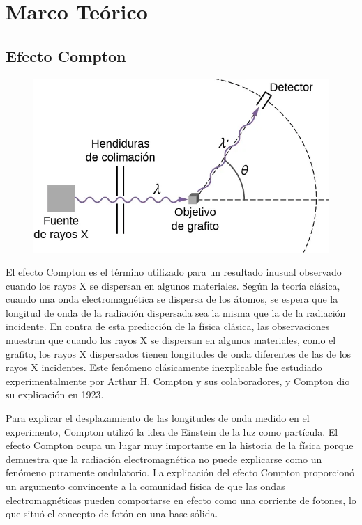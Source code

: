 \documentclass[letterpaper, 12pt]{article}
\begin{document}
\section{Marco Teórico}

\subsection{Efecto Compton~\cite{Moebs_2021}}

\begin{figure}
      \begin{center}
            \includegraphics[width=.3\textwidth]{Images/Imagen_2.png}
      \end{center}
\end{figure}

El efecto Compton es el término utilizado para un resultado
inusual observado cuando los rayos X se dispersan en
algunos materiales. Según la teoría clásica, cuando una
onda electromagnética se dispersa de los átomos, se espera
que la longitud de onda de la radiación dispersada sea la
misma que la de la radiación incidente. En contra de esta
predicción de la física clásica, las observaciones muestran
que cuando los rayos X se dispersan en algunos materiales,
como el grafito, los rayos X dispersados tienen longitudes
de onda diferentes de las de los rayos X incidentes. Este
fenómeno clásicamente inexplicable fue estudiado
experimentalmente por Arthur H. Compton y sus
colaboradores, y Compton dio su explicación en 1923.

Para explicar el desplazamiento de las longitudes de onda
medido en el experimento, Compton utilizó la idea de
Einstein de la luz como partícula. El efecto Compton ocupa
un lugar muy importante en la historia de la física porque
demuestra que la radiación electromagnética no puede
explicarse como un fenómeno puramente ondulatorio. La
explicación del efecto Compton proporcionó un argumento
convincente a la comunidad física de que las ondas
electromagnéticas pueden comportarse en efecto como una
corriente de fotones, lo que situó el concepto de fotón en
una base sólida.
\end{document}

